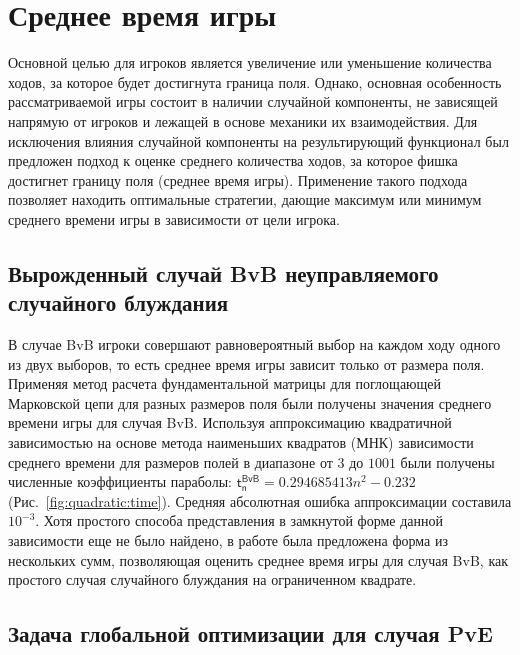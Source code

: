 \section{Среднее время игры}\label{sec:ch3/sec1}

Основной целью для игроков является увеличение или уменьшение количества ходов, за которое будет достигнута граница поля.
Однако, основная особенность рассматриваемой игры состоит в наличии случайной компоненты, не зависящей напрямую от игроков и лежащей в основе механики их взаимодействия.
Для исключения влияния случайной компоненты на результирующий функционал был предложен подход к оценке среднего количества ходов,
за которое фишка достигнет границу поля (среднее время игры).
Применение такого подхода позволяет находить оптимальные стратегии, дающие максимум или минимум среднего времени игры в зависимости от цели игрока.

\subsection{Вырожденный случай BvB неуправляемого случайного блуждания}\label{subsec:ch3/sec1/sub1}

В случае BvB игроки совершают равновероятный выбор на каждом ходу одного из двух выборов, то есть среднее время игры зависит только от размера поля.
Применяя метод расчета фундаментальной матрицы для поглощающей Марковской цепи для разных размеров поля были получены значения среднего времени игры для случая BvB.
Используя аппроксимацию квадратичной зависимостью на основе метода наименьших квадратов (МНК) зависимости среднего времени для размеров полей в диапазоне от $3$ до $1001$
были получены численные коэффициенты параболы: $\boldsymbol{\mathsf{t_n^{BvB}}} = 0.294685413 n^2 - 0.232$ (Рис.~\cref{fig:quadratic:time}). Средняя абсолютная ошибка аппроксимации составила $10^{-3}$. 
Хотя простого способа представления в замкнутой форме данной зависимости еще не было найдено, в работе \cite{kmet_gamblers_2002} была предложена форма из нескольких сумм, позволяющая оценить
среднее время игры для случая BvB, как простого случая случайного блуждания на ограниченном квадрате.

\subsection{Задача глобальной оптимизации для случая PvE}\label{subsec:ch3/sec1/sub2}

